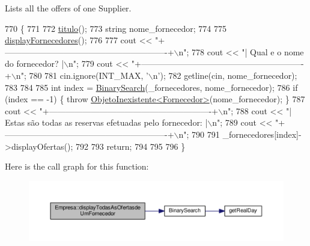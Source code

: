 Lists all the offers of one Supplier. 


\begin{DoxyCode}
770                                                   \{
771 
772     \hyperlink{classEmpresa_ad79f7196a8ce7256771cbd7b9542155c}{titulo}();
773     \textcolor{keywordtype}{string} nome\_fornecedor;
774 
775     \hyperlink{classEmpresa_a55c3756c01b45b41ad03f4e4f3e4dcac}{displayFornecedores}();
776 
777     cout << \textcolor{stringliteral}{"+----------------------------------------------------------+\(\backslash\)n"};
778     cout << \textcolor{stringliteral}{"| Qual e o nome do fornecedor?                                |\(\backslash\)n"};
779     cout << \textcolor{stringliteral}{"+----------------------------------------------------------+\(\backslash\)n"};
780 
781     cin.ignore(INT\_MAX, \textcolor{charliteral}{'\(\backslash\)n'});
782     getline(cin, nome\_fornecedor);
783 
784 
785     \textcolor{keywordtype}{int} index = \hyperlink{extras_8h_abc85c93edf561168b5bbee8054caa388}{BinarySearch}(\_fornecedores, nome\_fornecedor);
786     \textcolor{keywordflow}{if} (index == -1) \{ \textcolor{keywordflow}{throw} \hyperlink{classObjetoInexistente}{ObjetoInexistente<Fornecedor>}(nome\_fornecedor); \}
787     cout << \textcolor{stringliteral}{"+----------------------------------------------------------+\(\backslash\)n"};
788     cout << \textcolor{stringliteral}{"| Estas são todas as reservas efetuadas pelo fornecedor:      |\(\backslash\)n"};
789     cout << \textcolor{stringliteral}{"+----------------------------------------------------------+\(\backslash\)n"};
790 
791     \_fornecedores[index]->displayOfertas();
792 
793     \textcolor{keywordflow}{return};
794 
795 
796 \}
\end{DoxyCode}


Here is the call graph for this function\+:\nopagebreak
\begin{figure}[H]
\begin{center}
\leavevmode
\includegraphics[width=350pt]{classEmpresa_a73543b5ca1d9dd8e99e75d9167839471_cgraph}
\end{center}
\end{figure}


